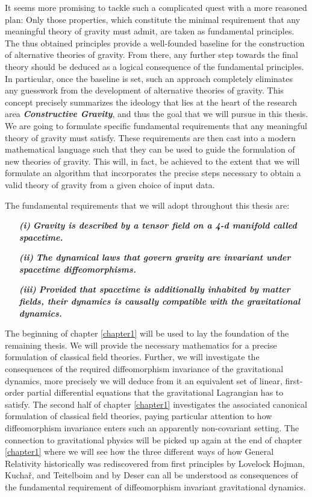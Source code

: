 It seems more promising to tackle such a complicated quest with a more reasoned plan: Only those properties, which constitute the minimal requirement that any meaningful theory of gravity must admit, are taken as fundamental principles. The thus obtained principles  provide a well-founded baseline for the construction of alternative theories of gravity. From there, any further step towards the final theory should be deduced as a logical consequence of the fundamental principles. In particular, once the baseline is set, such an approach completely eliminates any guesswork from the development of alternative theories of gravity. 
This concept precisely summarizes the ideology that lies at the heart of the research area \textit{\textbf{Constructive Gravity}}, and thus the goal that we will pursue in this thesis.
We are going to formulate specific fundamental requirements that any meaningful theory of gravity must satisfy. These requirements are then cast into a modern mathematical language such that they can be used to guide the formulation of new theories of gravity. This will, in fact, be achieved to the extent that we will formulate an algorithm that incorporates the precise steps necessary to obtain a valid theory of gravity from a given choice of input data. 

The fundamental requirements that we will adopt throughout this thesis are:
\begin{itemize}
    \item[\textbf{\textit{(i)}}] \textbf{\textit{Gravity is described by a tensor field on a 4-d manifold called spacetime.}}
    \item[\textbf{\textit{(ii)}}] \textbf{\textit{The dynamical laws that govern gravity are invariant under spacetime diffeomorphisms.}}
    \item[\textbf{\textit{(iii)}}] \textbf{\textit{Provided that spacetime is additionally inhabited by matter fields, their dynamics is causally compatible with the gravitational dynamics.}}
\end{itemize}

The beginning of chapter \ref{chapter1} will be used to lay the foundation of the remaining thesis. We will provide the necessary mathematics for a precise formulation of classical field theories. Further, we will investigate the consequences of the required diffeomorphism invariance of the gravitational dynamics, more precisely we will deduce from it an equivalent set of linear, first-order partial differential equations that the gravitational Lagrangian has to satisfy. The second half of chapter \ref{chapter1} investigates the associated canonical formulation of classical field theories, paying particular attention to how diffeomorphism invariance enters such an apparently non-covariant setting. The connection to gravitational physics will be picked up again at the end of chapter \ref{chapter1} where we will see how the three different ways of how General Relativity historically was rediscovered from first principles by Lovelock \cite{doi:10.1063/1.1665613} Hojman, Kuchař, and Teitelboim \cite{HOJMAN197688} and by Deser \cite{1970GReGr...1....9D} can all be understood as consequences of the fundamental requirement of diffeomorphism invariant gravitational dynamics.

